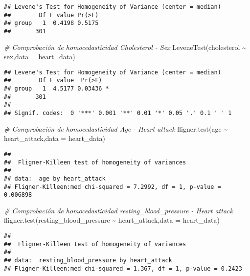 \documentclass[
]{article}
\newenvironment{Shaded}{\begin{snugshade}}{\end{snugshade}}
\newcommand{\AttributeTok}[1]{\textcolor[rgb]{0.77,0.63,0.00}{#1}}
\newcommand{\CommentTok}[1]{\textcolor[rgb]{0.56,0.35,0.01}{\textit{#1}}}
\newcommand{\FunctionTok}[1]{\textcolor[rgb]{0.00,0.00,0.00}{#1}}
\newcommand{\NormalTok}[1]{#1}
\newcommand{\SpecialCharTok}[1]{\textcolor[rgb]{0.00,0.00,0.00}{#1}}
\begin{document}
\begin{verbatim}
## Levene's Test for Homogeneity of Variance (center = median)
##        Df F value Pr(>F)
## group   1  0.4198 0.5175
##       301
\end{verbatim}

\begin{Shaded}
\begin{Highlighting}[]
\CommentTok{\# Comprobación de homocedasticidad Cholesterol {-} Sex}
\FunctionTok{LeveneTest}\NormalTok{(cholesterol }\SpecialCharTok{\textasciitilde{}}\NormalTok{ sex,}\AttributeTok{data =}\NormalTok{ heart\_data)}
\end{Highlighting}
\end{Shaded}

\begin{verbatim}
## Levene's Test for Homogeneity of Variance (center = median)
##        Df F value  Pr(>F)  
## group   1  4.5177 0.03436 *
##       301                  
## ---
## Signif. codes:  0 '***' 0.001 '**' 0.01 '*' 0.05 '.' 0.1 ' ' 1
\end{verbatim}

\begin{Shaded}
\begin{Highlighting}[]
\CommentTok{\# Comprobación de homocedasticidad Age {-} Heart attack}
\FunctionTok{fligner.test}\NormalTok{(age }\SpecialCharTok{\textasciitilde{}}\NormalTok{ heart\_attack,}\AttributeTok{data =}\NormalTok{ heart\_data)}
\end{Highlighting}
\end{Shaded}

\begin{verbatim}
## 
##  Fligner-Killeen test of homogeneity of variances
## 
## data:  age by heart_attack
## Fligner-Killeen:med chi-squared = 7.2992, df = 1, p-value = 0.006898
\end{verbatim}

\begin{Shaded}
\begin{Highlighting}[]
\CommentTok{\# Comprobación de homocedasticidad resting\_blood\_pressure {-} Heart attack}
\FunctionTok{fligner.test}\NormalTok{(resting\_blood\_pressure }\SpecialCharTok{\textasciitilde{}}\NormalTok{ heart\_attack,}\AttributeTok{data =}\NormalTok{ heart\_data)}
\end{Highlighting}
\end{Shaded}

\begin{verbatim}
## 
##  Fligner-Killeen test of homogeneity of variances
## 
## data:  resting_blood_pressure by heart_attack
## Fligner-Killeen:med chi-squared = 1.367, df = 1, p-value = 0.2423
\end{verbatim}
\end{document}
